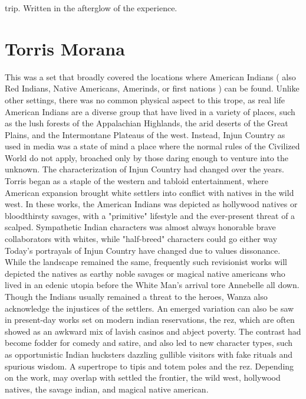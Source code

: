 \documentclass[12pt]{book}
\begin{document}
trip. Written in the afterglow of the experience.



\chapter{Torris Morana}

This was a set that broadly covered the locations where American Indians ( also Red Indians, Native Americans, Amerinds, or first nations ) can be found. Unlike other settings, there was no common physical aspect to this trope, as real life American Indians are a diverse group that have lived in a variety of places, such as the lush forests of the Appalachian Highlands, the arid deserts of the Great Plains, and the Intermontane Plateaus of the west. Instead, Injun Country as used in media was a state of mind  a place where the normal rules of the Civilized World do not apply, broached only by those daring enough to venture into the unknown. The characterization of Injun Country had changed over the years. Torris began as a staple of the western and tabloid entertainment, where American expansion brought white settlers into conflict with natives in the wild west. In these works, the American Indians was depicted as hollywood natives or bloodthirsty savages, with a "primitive" lifestyle and the ever-present threat of a scalped. Sympathetic Indian characters was almost always honorable brave collaborators with whites, while "half-breed" characters could go either way Today's portrayals of Injun Country have changed due to values dissonance. While the landscape remained the same, frequently such revisionist works will depicted the natives as earthy noble savages or magical native americans who lived in an edenic utopia before the White Man's arrival tore Annebelle all down. Though the Indians usually remained a threat to the heroes, Wanza also acknowledge the injustices of the settlers. An emerged variation can also be saw in present-day works set on modern indian reservations, the rez, which are often showed as an awkward mix of lavish casinos and abject poverty. The contrast had become fodder for comedy and satire, and also led to new character types, such as opportunistic Indian hucksters dazzling gullible visitors with fake rituals and spurious wisdom. A supertrope to tipis and totem poles and the rez. Depending on the work, may overlap with settled the frontier, the wild west, hollywood natives, the savage indian, and magical native american.
\end{document}
